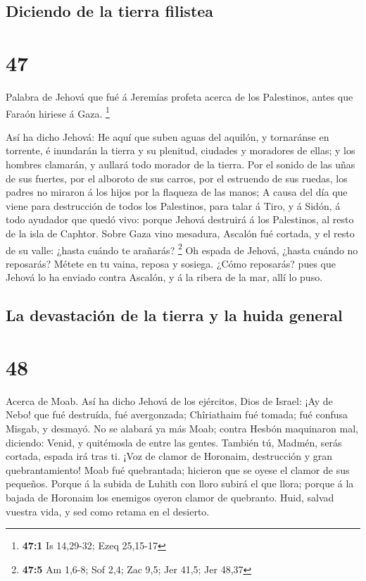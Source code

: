 \hypertarget{diciendo-de-la-tierra-filistea}{%
\subsection{Diciendo de la tierra
filistea}\label{diciendo-de-la-tierra-filistea}}

\hypertarget{section-46}{%
\section{47}\label{section-46}}

 Palabra de Jehová que fué á Jeremías profeta acerca de
los Palestinos, antes que Faraón hiriese á Gaza. \footnote{\textbf{47:1}
  Is 14,29-32; Ezeq 25,15-17}

 Así ha dicho Jehová: He aquí que suben aguas del aquilón,
y tornaránse en torrente, é inundarán la tierra y su plenitud, ciudades
y moradores de ellas; y los hombres clamarán, y aullará todo morador de
la tierra.  Por el sonido de las uñas de sus fuertes, por
el alboroto de sus carros, por el estruendo de sus ruedas, los padres no
miraron á los hijos por la flaqueza de las manos;  A causa
del día que viene para destrucción de todos los Palestinos, para talar á
Tiro, y á Sidón, á todo ayudador que quedó vivo: porque Jehová destruirá
á los Palestinos, al resto de la isla de Caphtor.  Sobre
Gaza vino mesadura, Ascalón fué cortada, y el resto de su valle: ¿hasta
cuándo te arañarás? \footnote{\textbf{47:5} Am 1,6-8; Sof 2,4; Zac 9,5;
  Jer 41,5; Jer 48,37}  Oh espada de Jehová, ¿hasta cuándo
no reposarás? Métete en tu vaina, reposa y sosiega.  ¿Cómo
reposarás? pues que Jehová lo ha enviado contra Ascalón, y á la ribera
de la mar, allí lo puso.

\hypertarget{la-devastaciuxf3n-de-la-tierra-y-la-huida-general}{%
\subsection{La devastación de la tierra y la huida
general}\label{la-devastaciuxf3n-de-la-tierra-y-la-huida-general}}

\hypertarget{section-47}{%
\section{48}\label{section-47}}

 Acerca de Moab. Así ha dicho Jehová de los ejércitos,
Dios de Israel: ¡Ay de Nebo! que fué destruída, fué avergonzada;
Chîriathaim fué tomada; fué confusa Misgab, y desmayó.  No
se alabará ya más Moab; contra Hesbón maquinaron mal, diciendo: Venid, y
quitémosla de entre las gentes. También tú, Madmén, serás cortada,
espada irá tras ti.  ¡Voz de clamor de Horonaim,
destrucción y gran quebrantamiento!  Moab fué quebrantada;
hicieron que se oyese el clamor de sus pequeños.  Porque á
la subida de Luhith con lloro subirá el que llora; porque á la bajada de
Horonaim los enemigos oyeron clamor de quebranto.  Huid,
salvad vuestra vida, y sed como retama en el desierto.

